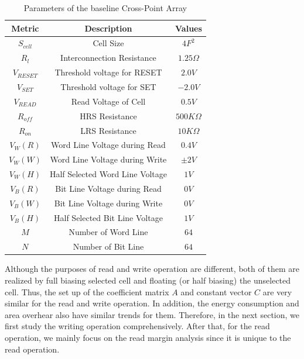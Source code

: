 \begin{table}[!b]
  \centering
  \scriptsize
    \scriptsize
  \caption{Parameters of the baseline Cross-Point Array}\label{table:parameter}
  \vspace{-5pt}
  \begin{tabular}{c|c|c}
    \hline    \hline
    \textbf{Metric} & \textbf{Description} & \textbf{Values} \\
    \hline
    \textbf{$S_{cell}$} & Cell Size & \textbf{$4F^2$} \\
    \textbf{$R_l$} &  Interconnection Resistance&\textbf{$1.25\Omega$} \\
    \textbf{$V_{RESET}$} & Threshold voltage for RESET&\textbf{$2.0V$} \\
    \textbf{$V_{SET}$} & Threshold voltage for SET&\textbf{$-2.0V$} \\
    \textbf{$V_{READ}$} & Read Voltage of Cell&\textbf{$0.5V$} \\
    \textbf{$R_{off}$} & HRS Resistance &\textbf{$500K\Omega$} \\
    \textbf{$R_{on}$} & LRS Resistance &\textbf{$10K\Omega$} \\
    \textbf{$V_{W}(R)$} & Word Line Voltage during Read &\textbf{$0.4V$} \\
    \textbf{$V_{W}(W)$} & Word Line Voltage during Write  &\textbf{$\pm2V$} \\
    \textbf{$V_{W}(H)$} & Half Selected Word Line Voltage &\textbf{$1V$} \\
    \textbf{$V_{B}(R)$} & Bit Line Voltage during Read  &\textbf{$0V$} \\
    \textbf{$V_{B}(W)$} & Bit Line Voltage during Write  &\textbf{$0V$} \\
    \textbf{$V_{B}(H)$} & Half Selected Bit Line Voltage &\textbf{$1V$} \\
    \textbf{$M$} & Number of Word Line &\textbf{$64$} \\
    \textbf{$N$} & Number of Bit Line &\textbf{$64$} \\
    \hline
  \end{tabular}
  \vspace{-10pt}
\end{table}

Although the purposes of read and write operation are different, both of them are realized by full biasing selected cell and floating (or half biasing) the unselected cell. Thus, the set up of the coefficient matrix $A$ and constant vector $C$ are very similar for the read and write operation. In addition, the energy consumption and area overhear also have similar trends for them. Therefore, in the next section,  we first study the writing operation comprehensively.  After that, for the read operation, we mainly focus on the read margin analysis since it is unique to the read operation.

